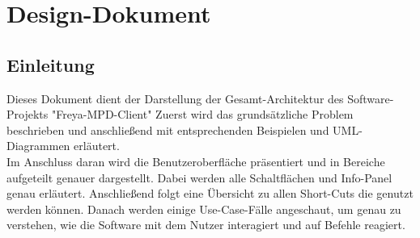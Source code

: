 \chapter{Design-Dokument}
\section{Einleitung}
Dieses Dokument dient der Darstellung der Gesamt-Architektur des Software-Projekts "Freya-MPD-Client"
Zuerst wird das grundsätzliche Problem beschrieben und anschließend mit entsprechenden Beispielen und
UML-Diagrammen erläutert.\ \\
Im Anschluss daran wird die Benutzeroberfläche präsentiert und in Bereiche aufgeteilt genauer dargestellt.
Dabei werden alle Schaltflächen und Info-Panel genau erläutert.
Anschließend folgt eine Übersicht zu allen Short-Cuts die genutzt werden können.
Danach werden einige Use-Case-Fälle angeschaut, um genau zu verstehen, wie die Software mit dem Nutzer
interagiert und auf Befehle reagiert.
\newpage
